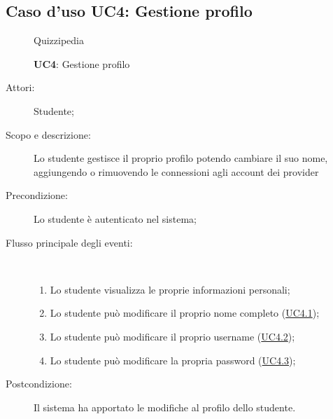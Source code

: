 \subsection{Caso d'uso UC4: Gestione profilo}
	\begin{figure}[H]
		\centering
		\begin{resizedtikzpicture}{\textwidth}
		\begin{umlsystem}[x=0, fill=lightgray!20]{Quizzipedia}
		\end{umlsystem}
		\end{resizedtikzpicture}
		\caption{\textbf{UC4}: Gestione profilo}
		\label{UC4}
	\end{figure}
\begin{description}
\item[Attori:] Studente;
\item[Scopo e descrizione:] Lo studente gestisce il proprio profilo potendo cambiare il suo nome, aggiungendo o rimuovendo le connessioni agli account dei provider 
      \item[Precondizione:] Lo studente è autenticato nel sistema;

        \item[Flusso principale degli eventi:] \ 
 \begin{enumerate}
          \item Lo studente visualizza le proprie informazioni personali;
          \item Lo studente può modificare il proprio nome completo (\hyperlink{UC4.1}{UC4.1});
          \item Lo studente può modificare il proprio username	 (\hyperlink{UC4.2}{UC4.2});
          \item Lo studente può modificare la propria password (\hyperlink{UC4.3}{UC4.3});

      \end{enumerate}
    \item[Postcondizione:] Il sistema ha apportato le modifiche al profilo dello studente.
  \end{description}
\hypertarget{UC4.1}{}
